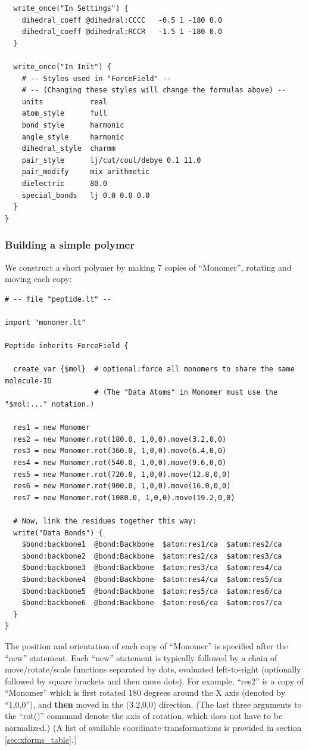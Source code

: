 \documentclass[11pt]{article}
\begin{document}
\begin{verbatim}
  write_once("In Settings") {
    dihedral_coeff @dihedral:CCCC   -0.5 1 -180 0.0
    dihedral_coeff @dihedral:RCCR   -1.5 1 -180 0.0
  }

  write_once("In Init") {
    # -- Styles used in "ForceField" --
    # -- (Changing these styles will change the formulas above) --
    units           real
    atom_style      full
    bond_style      harmonic
    angle_style     harmonic
    dihedral_style  charmm
    pair_style      lj/cut/coul/debye 0.1 11.0
    pair_modify     mix arithmetic
    dielectric      80.0
    special_bonds   lj 0.0 0.0 0.0
  }
}
\end{verbatim}



\subsubsection{Building a simple polymer}
We construct a short polymer by making 7 copies of ``Monomer'',
rotating and moving each copy:
\label{sec:2beadPeptide}
\begin{verbatim}
# -- file "peptide.lt" --

import "monomer.lt"

Peptide inherits ForceField {

  create_var {$mol}  # optional:force all monomers to share the same molecule-ID
                     # (The "Data Atoms" in Monomer must use the "$mol:..." notation.)

  res1 = new Monomer
  res2 = new Monomer.rot(180.0, 1,0,0).move(3.2,0,0)
  res3 = new Monomer.rot(360.0, 1,0,0).move(6.4,0,0)
  res4 = new Monomer.rot(540.0, 1,0,0).move(9.6,0,0)
  res5 = new Monomer.rot(720.0, 1,0,0).move(12.8,0,0)
  res6 = new Monomer.rot(900.0, 1,0,0).move(16.0,0,0)
  res7 = new Monomer.rot(1080.0, 1,0,0).move(19.2,0,0)

  # Now, link the residues together this way:
  write("Data Bonds") {
    $bond:backbone1  @bond:Backbone  $atom:res1/ca  $atom:res2/ca
    $bond:backbone2  @bond:Backbone  $atom:res2/ca  $atom:res3/ca
    $bond:backbone3  @bond:Backbone  $atom:res3/ca  $atom:res4/ca
    $bond:backbone4  @bond:Backbone  $atom:res4/ca  $atom:res5/ca
    $bond:backbone5  @bond:Backbone  $atom:res5/ca  $atom:res6/ca
    $bond:backbone6  @bond:Backbone  $atom:res6/ca  $atom:res7/ca
  }
}
\end{verbatim}
The position and orientation of each copy of ``Monomer'' 
is specified after the ``new'' statement. 
Each ``new'' statement is typically followed by a chain of 
move/rotate/scale functions separated by dots, evaluated left-to-right
(optionally followed by square brackets and then more dots). 
For example, ``res2'' is a copy of ``Monomer'' which is first rotated 
180 degrees around the X axis (denoted by ``1,0,0''), 
and \textbf{then} moved in the (3.2,0,0) direction.
(The last three arguments to the ``rot()'' command 
 denote the axis of rotation, which does not have to be normalized.)
(A list of available coordinate transformations 
is provided in section \ref{sec:xforms_table}.)
\end{document}

